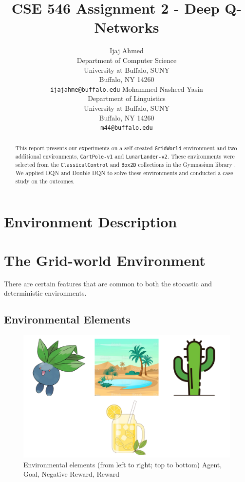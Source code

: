 \documentclass{article} %
\title{CSE 546 Assignment 2 - Deep Q-Networks}
\author{
   Ijaj Ahmed \\
   Department of Computer Science\\
   University at Buffalo, SUNY\\
   Buffalo, NY 14260 \\
   \texttt{ijajahme@buffalo.edu}
   \And
   Mohammed Nasheed Yasin \\
   Department of Linguistics\\
   University at Buffalo, SUNY\\
   Buffalo, NY 14260 \\
   \texttt{m44@buffalo.edu}
}
\begin{document}
\maketitle

\begin{abstract}
    This report presents our experiments on a self-created \verb|GridWorld| environment and two additional environments, \verb|CartPole-v1| and \verb|LunarLander-v2|. These environments were selected from the \verb|ClassicalControl| and \verb|Box2D| collections in the Gymnasium library \cite{1606.01540}. We applied DQN and Double DQN to solve these environments and conducted a case study on the outcomes.
\end{abstract}

\section*{Environment Description}


\section{The Grid-world Environment}
\label{sec:definition}

There are certain features that are common to both the stocastic and deterministic environments.

\subsection*{Environmental Elements}
\begin{figure}[h]
    \begin{center}
        \includegraphics[width=\textwidth]{elements.png}
    \end{center}
    \caption{Environmental elements (from left to right; top to bottom) Agent, Goal,
        Negative Reward, Reward}
    \label{fig:elements}
\end{figure}
\end{document}
